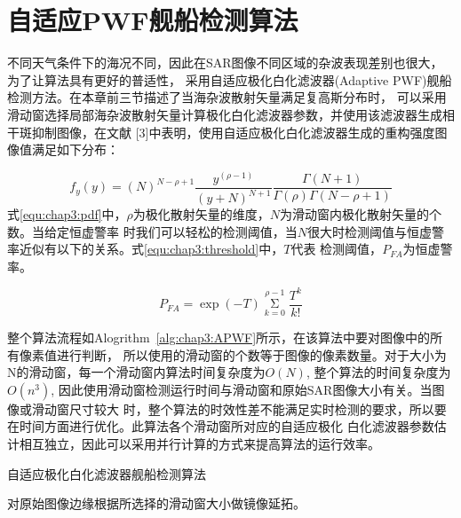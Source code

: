 \section{自适应PWF舰船检测算法}
不同天气条件下的海况不同，因此在SAR图像不同区域的杂波表现差别也很大，为了让算法具有更好的普适性，
采用自适应极化白化滤波器(Adaptive PWF)舰船检测方法。在本章前三节描述了当海杂波散射矢量满足复高斯分布时，
可以采用滑动窗选择局部海杂波散射矢量计算极化白化滤波器参数，并使用该滤波器生成相干斑抑制图像，在文献
[3]中表明，使用自适应极化白化滤波器生成的重构强度图像值满足如下分布：

\begin{equation}
  \label{equ:chap3:pdf}
  {f_y}(y) = {(N)^{N - \rho  + 1}}\frac{{{y^{(\rho  - 1)}}}}{{{{(y + N)}^{N + 1}}}}\frac{{\Gamma (N + 1)}}{{\Gamma (\rho )\Gamma (N - \rho  + 1)}}
\end{equation}
式\ref{equ:chap3:pdf}中，$\rho$为极化散射矢量的维度，$N$为滑动窗内极化散射矢量的个数。当给定恒虚警率
时我们可以轻松的检测阈值，当$N$很大时检测阈值与恒虚警率近似有以下的关系。式\ref{equ:chap3:threshold}中，$T$代表
检测阈值，$P_{FA}$为恒虚警率。

\begin{equation}
  \label{equ:chap3:threshold}
  {P_{FA}} = \exp ( - T)\mathop \Sigma \limits_{k = 0}^{\rho  - 1} \frac{{{T^k}}}{{k!}}
\end{equation}

整个算法流程如Alogrithm~\ref{alg:chap3:APWF}所示，在该算法中要对图像中的所有像素值进行判断，
所以使用的滑动窗的个数等于图像的像素数量。对于大小为N的滑动窗，每一个滑动窗内算法时间复杂度为$O(N)$,
整个算法的时间复杂度为$O(n^3)$, 因此使用滑动窗检测运行时间与滑动窗和原始SAR图像大小有关。当图像或滑动窗尺寸较大
时，整个算法的时效性差不能满足实时检测的要求，所以要在时间方面进行优化。此算法各个滑动窗所对应的自适应极化
白化滤波器参数估计相互独立，因此可以采用并行计算的方式来提高算法的运行效率。

\begin{algorithm}[t]
  \caption{自适应极化白化滤波器舰船检测算法}
  \label{alg:chap3:APWF}
  \BlankLine
  
  对原始图像边缘根据所选择的滑动窗大小做镜像延拓。

 \end{algorithm}

